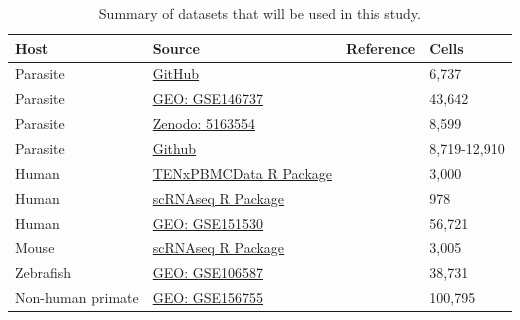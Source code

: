 \documentclass{article}
\begin{document}
\begin{table}[!h]
  \caption{Summary of datasets that will be used in this study.}
  \label{tab:dat_summary}
  \centering
  \begin{tabularx}{\textwidth}{lXll}
    \toprule
    \textbf{Host} & \textbf{Source} & \textbf{Reference} & \textbf{Cells} \\
    \midrule
    Parasite & \href{https://github.com/vhowick/MalariaCellAtlas/tree/4e19a713d0681b118cc7e229133489f039b8766b/Expression_Matrices/10X/pf10xIDC}{GitHub} & \citet{howickMalariaCellAtlas2019} & 6,737 \\
    \midrule
    Parasite & \href{https://www.ncbi.nlm.nih.gov/geo/query/acc.cgi?acc=GSE146737}{GEO: GSE146737} & \citet{wendtSinglecellRNAseqAtlas2020} & 43,642 \\
    \midrule
    Parasite & \href{https://zenodo.org/records/5163554}{Zenodo: 5163554} & \citet{briggsSinglecellTranscriptomicAnalysis2021} & 8,599 \\
    \midrule
    Parasite & \href{https://github.com/umbibio/scBabesiaAtlases}{Github} & \citet{rezvaniComparativeSinglecellTranscriptional2022} & 8,719-12,910 \\
    \midrule
Human & \href{https://doi.org/doi:10.18129/B9.bioc.TENxPBMCData}{TENxPBMCData R Package} & \citet{hansenTENxPBMCData2018} & 3,000 \\
    \midrule
    Human & \href{https://doi.org/doi:10.18129/B9.bioc.scRNAseq}{scRNAseq R Package
} & \citet{rissoScRNAseq2017, lawlorSinglecellTranscriptomesIdentify2017} & 978 \\
    \midrule
    Human & \href{https://www.ncbi.nlm.nih.gov/geo/query/acc.cgi?acc=GSE151530}{GEO: GSE151530} & \citet{maMultiregionalSinglecellDissection2022} & 56,721 \\
    \midrule
    Mouse & \href{https://doi.org/doi:10.18129/B9.bioc.scRNAseq}{scRNAseq R Package} & \citet{rissoScRNAseq2017, zeiselCellTypesMouse2015} & 3,005 \\
    \midrule
    Zebrafish & \href{https://www.ncbi.nlm.nih.gov/geo/query/acc.cgi?acc=GSE106587}{GEO: GSE106587} & \citet{farrellSinglecellReconstructionDevelopmental2018}  & 38,731 \\
    \midrule
    Non-human primate & \href{https://www.ncbi.nlm.nih.gov/geo/query/acc.cgi?acc=GSE156755}{GEO: GSE156755} & \citet{speranzaSinglecellRNASequencing2021} & 100,795 \\
    \bottomrule
  \end{tabularx}
\end{table}
\end{document}
